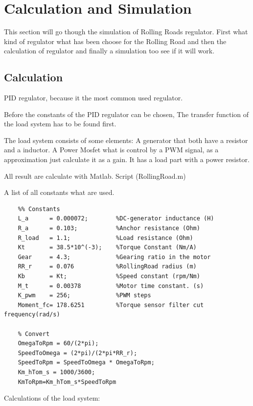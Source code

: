 \newpage
\section{Calculation and Simulation} %
\label{sec:Calculation_and_Simulation}

This section will go though the simulation of Rolling Roads regulator. First what kind of regulator what has been choose for the Rolling Road and then the calculation of regulator and finally a simulation too see if it will work.

\subsection{Calculation}
PID regulator, because it the most common used regulator.

Before the constants of the PID regulator can be chosen, The transfer function of the load system has to be found first.

The load system consists of some elements: A generator that both have a resistor and a inductor. A Power Mosfet what is control by a PWM signal, as a approximation just calculate it as a gain. It has a load part with a power resistor.

All result are calculate with Matlab. Script (RollingRoad.m)   

A list of all constants what are used.
\lstset{language=MATLAB}
\begin{lstlisting}
	%% Constants
	L_a      = 0.000072;        %DC-generator inductance (H)
	R_a      = 0.103;           %Anchor resistance (Ohm)
	R_load   = 1.1;             %Load resistance (Ohm)
	Kt       = 38.5*10^(-3);    %Torque Constant (Nm/A)
	Gear     = 4.3;             %Gearing ratio in the motor
	RR_r     = 0.076            %RollingRoad radius (m)
	Kb       = Kt;              %Speed constant (rpm/Nm)
	M_t      = 0.00378          %Motor time constant. (s)
	K_pwm    = 256;             %PWM steps 
	Moment_fc= 178.6251			%Torque sensor filter cut frequency(rad/s)
	
	% Convert 
	OmegaToRpm = 60/(2*pi);
	SpeedToOmega = (2*pi)/(2*pi*RR_r);
	SpeedToRpm = SpeedToOmega * OmegaToRpm;
	Km_hTom_s = 1000/3600;
	KmToRpm=Km_hTom_s*SpeedToRpm
\end{lstlisting} 

Calculations of the load system:

